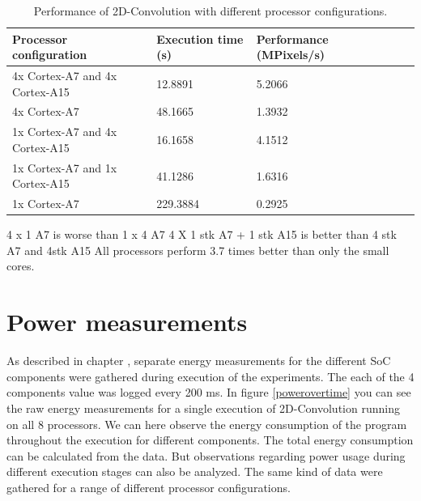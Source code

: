 \begin{table}[H]
  \begin{tabular}{llllll}
    \toprule
    Processor configuration           & Execution time (s)  & Performance (MPixels/s) \\
    \midrule
    4x Cortex-A7 and 4x Cortex-A15    & 12.8891             & 5.2066\\
    4x Cortex-A7                      & 48.1665             & 1.3932\\
    1x Cortex-A7 and 4x Cortex-A15    & 16.1658             & 4.1512\\
    1x Cortex-A7 and 1x Cortex-A15    & 41.1286             & 1.6316\\
    1x Cortex-A7                      & 229.3884            & 0.2925\\
    \bottomrule
  \end{tabular}
  \caption{Performance of 2D-Convolution with different processor configurations. \label{overflow}}
\end{table}


4 x 1 A7 is worse than 1 x 4 A7
4 X 1 stk A7 + 1 stk A15 is better than 4 stk A7 and 4stk A15
All processors perform 3.7 times better than only the small cores.

\section{Power measurements}
As described in chapter , separate energy measurements for the different SoC components were gathered during execution of the experiments.
The each of the 4 components value was logged every 200 ms.
In figure \ref{powerovertime} you can see the raw energy measurements for a single execution of 2D-Convolution running on all 8 processors.
We can here observe the energy consumption of the program throughout the execution for different components.
The total energy consumption can be calculated from the data.
But observations regarding power usage during different execution stages can also be analyzed.
The same kind of data were gathered for a range of different processor configurations.

